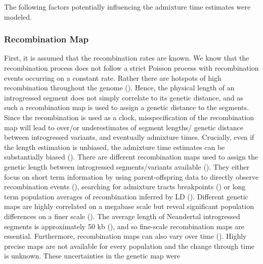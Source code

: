 \documentclass[]{article}
\begin{document}
The following factors potentially influencing the admixture time estimates were modeled.



\subsubsection{Recombination Map}\label{recombination-map}

First, it is assumed that the recombination rates are known. We know
that the recombination process does not follow a strict Poisson process
with recombination events occurring on a constant rate. Rather there are
hotspots of high recombination throughout the genome
(\cite{mcvean_fine-scale_2004}). Hence, the physical length of an
introgressed segment does not simply correlate to its genetic distance,
and as such a recombination map is used to assign a genetic distance to
the segments. Since the recombination is used as a clock,
misspecification of the recombination map will lead to over/or
underestimates of segment lengths/ genetic distance between introgressed
variants, and eventually admixture times. Crucially, even if the length estimation
is unbiased, the admixture time estimates can be substantially biased
(\cite{sankararaman_date_2012,fu_genome_2014}).
There are different
recombination maps used to assign the genetic length between
introgressed segments/variants available
(\cite{coop_high-resolution_2008,kong_fine-scale_2010,hinch_landscape_2011,wegmann_recombination_2011,mcvean_fine-scale_2004,myers_fine-scale_2005,HapMapConsortium_second_2007}). They either focus on short term information by using parent-offspring
data to directly observe recombination events
(\cite{coop_high-resolution_2008,kong_fine-scale_2010}), searching for
admixture tracts breakpoints
(\cite{hinch_landscape_2011,wegmann_recombination_2011}) or long term
population averages of recombination inferred by LD
(\cite{mcvean_fine-scale_2004,myers_fine-scale_2005,HapMapConsortium_second_2007}).
Different genetic maps are highly correlated on a megabase scale but
reveal significant population differences on a finer scale
(\cite{kong_fine-scale_2010,hinch_landscape_2011}). The average length
of Neandertal introgressed segments is approximately 50 kb
(\cite{sankararaman_date_2012,vernot_resurrecting_2014}), and so
fine-scale recombination maps are essential. Furthermore, recombination
maps can also vary over time (\cite{auton_fine-scale_2012}). Highly
precise maps are not available for every population and the change
through time is unknown. These uncertainties in the genetic map were
\end{document}
